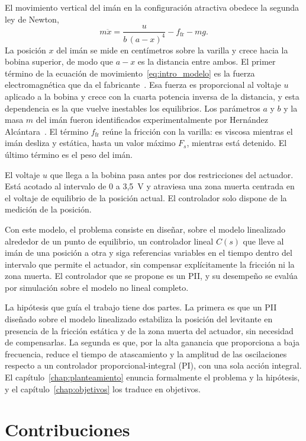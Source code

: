 El movimiento vertical del imán en la configuración atractiva obedece la segunda ley de Newton,
\begin{equation}
m\ddot{x} = \frac{u}{b\,(a-x)^4} - f_{\text{fr}} - mg .
\label{eq:intro_modelo}
\end{equation}
La posición $x$ del imán se mide en centímetros sobre la varilla y crece hacia la bobina superior, de modo que $a-x$ es la distancia entre ambos. El primer término de la ecuación de movimiento~\eqref{eq:intro_modelo} es la fuerza electromagnética que da el fabricante~\cite{parks}. Esa fuerza es proporcional al voltaje $u$ aplicado a la bobina y crece con la cuarta potencia inversa de la distancia, y esta dependencia es la que vuelve inestables los equilibrios. Los parámetros $a$ y $b$ y la masa $m$ del imán fueron identificados experimentalmente por Hernández Alcántara~\cite{diana_tesis}. El término $f_{\text{fr}}$ reúne la fricción con la varilla: es viscosa mientras el imán desliza y estática, hasta un valor máximo $F_s$, mientras está detenido. El último término es el peso del imán.

El voltaje $u$ que llega a la bobina pasa antes por dos restricciones del actuador. Está acotado al intervalo de 0 a 3{,}5~V y atraviesa una zona muerta centrada en el voltaje de equilibrio de la posición actual. El controlador solo dispone de la medición de la posición.

Con este modelo, el problema consiste en diseñar, sobre el modelo linealizado alrededor de un punto de equilibrio, un controlador lineal $C(s)$ que lleve al imán de una posición a otra y siga referencias variables en el tiempo dentro del intervalo que permite el actuador, sin compensar explícitamente la fricción ni la zona muerta. El controlador que se propone es un PII, y su desempeño se evalúa por simulación sobre el modelo no lineal completo.

La hipótesis que guía el trabajo tiene dos partes. La primera es que un PII diseñado sobre el modelo linealizado estabiliza la posición del levitante en presencia de la fricción estática y de la zona muerta del actuador, sin necesidad de compensarlas. La segunda es que, por la alta ganancia que proporciona a baja frecuencia, reduce el tiempo de atascamiento y la amplitud de las oscilaciones respecto a un controlador proporcional-integral (PI), con una sola acción integral. El capítulo~\ref{chap:planteamiento} enuncia formalmente el problema y la hipótesis, y el capítulo~\ref{chap:objetivos} los traduce en objetivos.

\section{Contribuciones}

